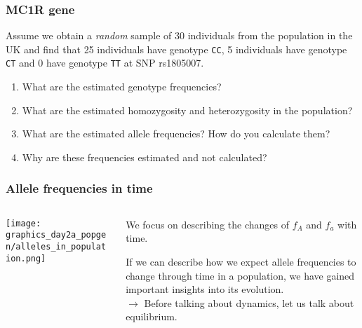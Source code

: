 \documentclass{beamer}
\newcommand{\1}{\ensuremath{\mathbf{1}}}
\begin{document}
%
%
%
\begin{frame}\frametitle{MC1R gene}
	Assume we obtain a \emph{random} sample of 30 individuals from the population in the UK and find that 25 individuals have genotype \texttt{CC}, 5 individuals have genotype \texttt{CT} and 0 have genotype \texttt{TT} at SNP rs1805007.
	\begin{enumerate}
		\item What are the estimated genotype frequencies?
		\item What are the estimated homozygosity and heterozygosity in the population?
		\item What are the estimated allele frequencies? How do you calculate them?
		\item Why are these frequencies estimated and not calculated?
	\end{enumerate}
\end{frame}
%
%
%
\begin{frame}\frametitle{Allele frequencies in time}
	\begin{columns}
	\begin{column}{.36\textwidth}
		\begin{center}
		\texttt{[image: graphics\_day2a\_popgen/alleles\_in\_population.png]}
		\end{center}
	\end{column}
	\begin{column}{.64\textwidth}
		\begin{block}{}
			We focus on describing the changes of $f_A$ and $f_a$ with time.
		\end{block}\vspace{2ex}
		If we can describe how we expect allele frequencies to change through time in a population, we have gained important insights into its evolution.\\[2ex]
		$\to$ Before talking about dynamics, let us talk about equilibrium.
	\end{column}
	\end{columns}
\end{frame}
%
%
%
\end{document}
